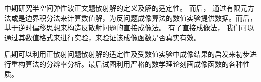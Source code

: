 中期研究半空间弹性波正文题散射解的定义及解的适定性。 而后， 通过有限元方法或是边界积分法来计算数值解，为反问题成像算法的数值实验提供数据。而后， 基于逆时偏移思想来构造反散射问题的直接成像法。 有了直接成像法， 我们可以通过其数值格式来进行实验，来验证该成像函数是否真实有效。

后期可以利用正散射问题散射解的适定性及受数值实验中成像结果的启发来初步进行重构算法的分辨率分析。最后试图利用严格的数学理论刻画成像函数的各种性质。



